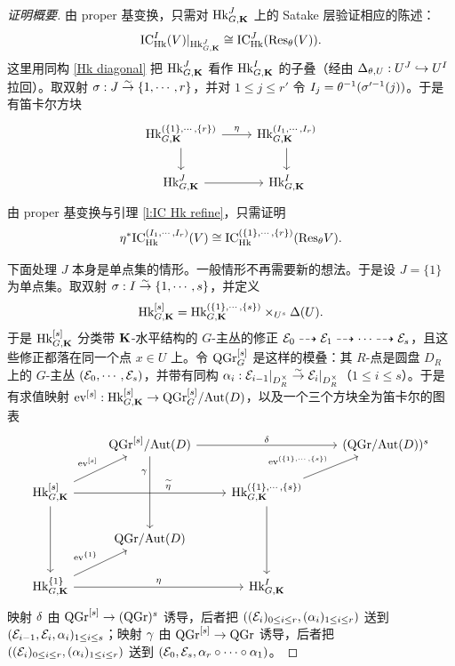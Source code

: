 \begin{proof}[证明概要]
由 proper 基变换，只需对 $\textup{Hk}^{J}_{G,\mathbf{K}}$ 上的 Satake 层验证相应的陈述：
\begin{equation*}
\textup{IC}^{I}_{\textup{Hk}}(V)|_{\textup{Hk}^{J}_{G,\mathbf{K}}}\cong \textup{IC}^{J}_{\textup{Hk}}(\textup{Res}_{\theta}(V)).
\end{equation*}
这里用同构 \eqref{Hk diagonal} 把 $\textup{Hk}^{J}_{G,\mathbf{K}}$ 看作 $\textup{Hk}^{I}_{G,\mathbf{K}}$ 的子叠（经由 $\Delta_{\theta, U}: U^{J}\hookrightarrow U^{I}$ 拉回）。取双射 $\sigma: J\stackrel{\sim}{\to} \{1,\cdots, r\}$，并对 $1\le j\le r'$ 令 $I_{j}=\theta^{-1}(\sigma'^{-1}(j))$。于是有笛卡尔方块
\begin{equation*}
\begin{tikzcd}
\Hk^{(\{1\},\cdots, \{r\})}_{G,\bK} \arrow[r,"\y"] \arrow[d] & \Hk^{(I_{1},\cdots, I_{r})}_{G,\bK} \arrow[d] \\
\Hk^{J}_{G,\bK} \arrow[r] & \Hk^{I}_{G,\bK}
\end{tikzcd}
\end{equation*}
由 proper 基变换与引理 \ref{l:IC Hk refine}，只需证明
\begin{equation}\label{IC fact b}
\eta^{*}\textup{IC}^{(I_{1},\cdots, I_{r})}_{\textup{Hk}}(V)\cong \textup{IC}^{(\{1\},\cdots ,\{r\})}_{\textup{Hk}}(\textup{Res}_{\theta}V).
\end{equation}

下面处理 $J$ 本身是单点集的情形。一般情形不再需要新的想法。于是设 $J=\{1\}$ 为单点集。取双射 $\sigma: I\stackrel{\sim}{\to} \{1,\cdots, s\}$，并定义
\begin{equation*}
\textup{Hk}^{[s]}_{G,\mathbf{K}}=\textup{Hk}^{(\{1\},\cdots,\{s\})}_{G,\mathbf{K}}\times_{U^{s}}\Delta(U).
\end{equation*}
于是 $\textup{Hk}^{[s]}_{G,\mathbf{K}}$ 分类带 $\mathbf{K}$-水平结构的 $G$-主丛的修正 $\mathcal{E}_{0}\dashrightarrow\mathcal{E}_{1}\dashrightarrow\cdots\dashrightarrow\mathcal{E}_{s}$，且这些修正都落在同一个点 $x\in U$ 上。令 $\mathrm{QGr}^{[s]}_{G}$ 是这样的模叠：其 $R$-点是圆盘 $D_{R}$ 上的 $G$-主丛 $(\mathcal{E}_{0},\cdots, \mathcal{E}_{s})$，并带有同构 $\alpha_{i}: \mathcal{E}_{i-1}|_{D_{R}^{\times}}\stackrel{\sim}{\to}\mathcal{E}_{i}|_{D^{\times}_{R}}$（$1\le i\le s$）。于是有求值映射 $\textup{ev}^{[s]}: \textup{Hk}^{[s]}_{G,\mathbf{K}}\to \mathrm{QGr}^{[s]}_{G}/\textup{Aut}(D)$，以及一个三个方块全为笛卡尔的图表
\begin{equation*}
\begin{tikzcd}
 & \QGr^{[s]}/\Aut(D) \arrow[rr,"\d"] \arrow[dd,"\g"' pos=0.22] & & (\QGr/\Aut(D))^{s} \\
\Hk^{[s]}_{G,\bK} \arrow[rr,"\wt\y" pos=0.62] \arrow[dd] \arrow[ur,"\ev^{[s]}"] & & \Hk^{(\{1\},\cdots,\{s\})}_{G,\bK} \arrow[ur,"\ev^{(\{1\},\cdots,\{s\})}"] \arrow[dd] & \\
 & \QGr/\Aut(D) & & \\
\Hk^{\{1\}}_{G,\bK} \arrow[ur,"\ev^{\{1\}}"] \arrow[rr,"\y"] & & \Hk^{I}_{G,\bK} &
\end{tikzcd}
\end{equation*}
映射 $\delta$ 由 $\mathrm{QGr}^{[s]}\to (\mathrm{QGr})^{s}$ 诱导，后者把 $((\mathcal{E}_{i})_{0\le i\le r},(\alpha_{i})_{1\le i\le r})$ 送到 $(\mathcal{E}_{i-1},\mathcal{E}_{i}, \alpha_{i})_{1\le i\le s}$；映射 $\gamma$ 由 $\mathrm{QGr}^{[s]}\to \mathrm{QGr}$ 诱导，后者把 $((\mathcal{E}_{i})_{0\le i\le r},(\alpha_{i})_{1\le i\le r})$ 送到 $(\mathcal{E}_{0},\mathcal{E}_{s}, \alpha_{r}\circ\cdots\circ\alpha_{1})$。


\end{proof}

